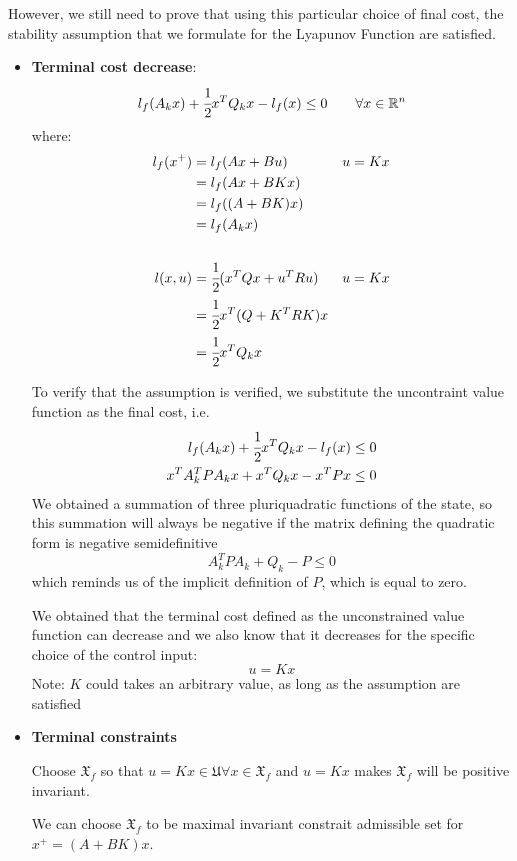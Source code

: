 However, we still need to prove that using this particular choice of final cost, the stability assumption that we formulate for the Lyapunov Function are satisfied.
\begin{itemize}
\item \textbf{Terminal cost decrease}:
\[l_f(A_k x) + \cfrac{1}{2}x^TQ_kx - l_f(x)\le0\qquad\forall x \in \mathbb{R}^n\]
where:
\begin{align*}
l_f(x^+) &= l_f(Ax + Bu)&u=Kx\\
&=  l_f(Ax + BKx)&\\
&= l_f((A+BK)x) &\\
&= l_f(A_kx)&\\
&&\\
l(x, u) &= \cfrac{1}{2}(x^TQx + u^TRu)&u = Kx\\
&= \cfrac{1}{2}x^T(Q+K^TRK)x\\
&= \cfrac{1}{2}x^TQ_kx
\end{align*}

To verify that the assumption is verified, we substitute the uncontraint value function as the final cost, i.e.
\begin{align*}
l_f(A_k x) + \cfrac{1}{2}x^TQ_kx - l_f(x)&\le0\\
x^TA_k^TPA_kx + x^TQ_kx - x^TPx &\le0
\end{align*}
We obtained a summation of three pluriquadratic functions of the state, so this summation will always be negative if the matrix defining the quadratic form is negative semidefinitive
\[A_k^TPA_k + Q_k - P \le 0\]
which reminds us of the implicit definition of $P$, which is equal to zero.

We obtained that the terminal cost defined as the unconstrained value function can decrease and we also know that it decreases for the specific choice of the control input:
\[u=Kx\]
Note: $K$ could takes an arbitrary value, as long as the assumption are satisfied
\item \textbf{Terminal constraints}

Choose $\mathfrak{X}_f$ so that $u=Kx\in\mathfrak{U} \forall x\in\mathfrak{X}_f$ and $u=Kx$ makes $\mathfrak{X}_f$ will be positive invariant.

We can choose $\mathfrak{X}_f$ to be maximal invariant constrait admissible set for $x^+=(A+BK)x$.
\end{itemize}

